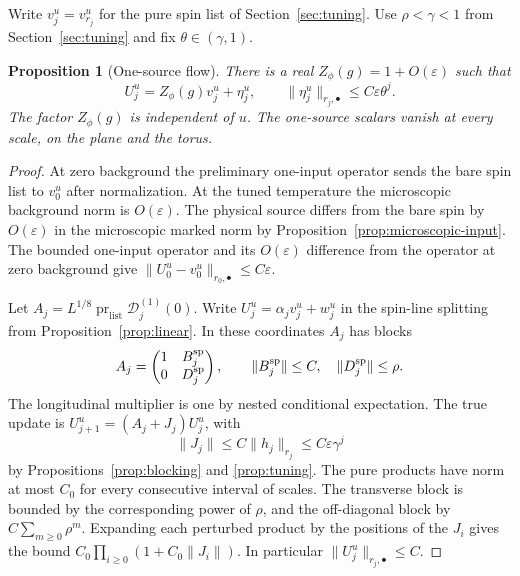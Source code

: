 \documentclass[11pt]{article}
\newtheorem{proposition}{Proposition}[section]
\theoremstyle{definition}
\begin{document}
Write \(v_j^u=v_{r_j}^u\) for the pure spin list of
Section~\ref{sec:tuning}.
Use \(\rho<\gamma<1\) from Section~\ref{sec:tuning} and fix
\(\theta\in(\gamma,1)\).

\begin{proposition}[One-source flow]
\label{prop:one-source}
There is a real
\(Z_\phi(g)=1+O(\varepsilon)\) such that
\begin{equation}
 U_j^u=Z_\phi(g)v_j^u+\eta_j^u,\qquad
 \|\eta_j^u\|_{r_j,\bullet}\le C\varepsilon\theta^j .
 \label{eq:bulk-direct-one-mark-flow}
\end{equation}
The factor \(Z_\phi(g)\) is independent of \(u\).
The one-source scalars vanish at every scale, on the plane and
the torus.
\end{proposition}

\begin{proof}
At zero background the preliminary one-input operator sends the
bare spin list to \(v_0^u\) after normalization. At the tuned
temperature the microscopic background norm is \(O(\varepsilon)\).
The physical source differs from the bare spin by \(O(\varepsilon)\)
in the microscopic marked norm by
Proposition~\ref{prop:microscopic-input}. The bounded one-input
operator and its \(O(\varepsilon)\) difference from the operator
at zero background give
\(\|U_0^u-v_0^u\|_{r_0,\bullet}\le C\varepsilon\).

Let \(A_j=L^{1/8}\operatorname{pr}_{\mathrm{list}}\mathcal D_j^{(1)}(0)\).
Write \(U_j^u=\alpha_jv_j^u+w_j^u\) in the spin-line
splitting from Proposition~\ref{prop:linear}.
In these coordinates \(A_j\) has blocks
\[
 A_j=
 \begin{pmatrix}1&B_j^{\rm sp}\\0&D_j^{\rm sp}\end{pmatrix},
 \qquad \|B_j^{\rm sp}\|\le C,\quad
 \|D_j^{\rm sp}\|\le\rho .
\]
The longitudinal multiplier is one by nested conditional
expectation. The true update is \(U_{j+1}^u=(A_j+J_j)U_j^u\),
with
\[
 \|J_j\|\le C\|h_j\|_{r_j}\le C\varepsilon\gamma^j
\]
by Propositions~\ref{prop:blocking} and \ref{prop:tuning}.
The pure products have norm at most \(C_0\) for every
consecutive interval of scales. The transverse block is bounded
by the corresponding power of \(\rho\), and the off-diagonal
block by \(C\sum_{m\ge0}\rho^m\). Expanding each perturbed
product by the positions of the \(J_i\) gives the bound
\(C_0\prod_{i\ge0}(1+C_0\|J_i\|)\).
In particular \(\|U_j^u\|_{r_j,\bullet}\le C\).


\end{proof}
\end{document}

